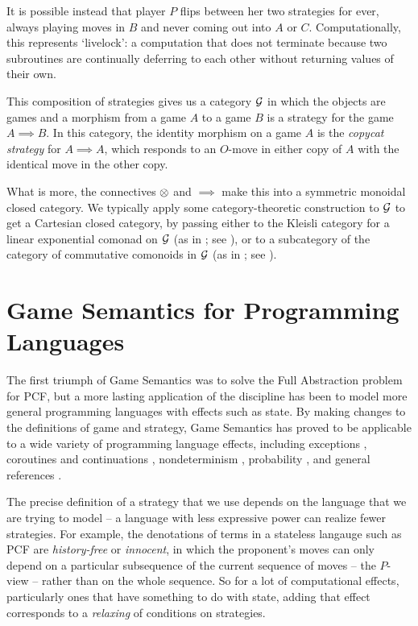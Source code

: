 \documentclass[11pt]{report}
\begin{document}
It is possible instead that player $P$ flips between her two strategies for ever, always playing moves in $B$ and never coming out into $A$ or $C$.  
Computationally, this represents `livelock': a computation that does not terminate because two subroutines are continually deferring to each other without returning values of their own.

This composition of strategies gives us a category $\mathcal G$ in which the objects are games and a morphism from a game $A$ to a game $B$ is a strategy for the game $A\implies B$.  
In this category, the identity morphism on a game $A$ is the \emph{copycat strategy} for $A\implies A$, which responds to an $O$-move in either copy of $A$ with the identical move in the other copy.

What is more, the connectives $\otimes$ and $\implies$ make this into a symmetric monoidal closed category.  
We typically apply some category-theoretic construction to $\mathcal G$ to get a Cartesian closed category, by passing either to the Kleisli category for a linear exponential comonad on $\mathcal G$ (as in \cite{ajmPcf}; see \cite{SchalkWhatIs}), or to a subcategory of the category of commutative comonoids in $\mathcal G$ (as in \cite{hoPcf,SamsonGuyIAActive}; see \cite[.2]{RusssThesis}).

\section{Game Semantics for Programming Languages}

The first triumph of Game Semantics was to solve the Full Abstraction problem for PCF, but a more lasting application of the discipline has been to model more general programming languages with effects such as state.
By making changes to the definitions of game and strategy, Game Semantics has proved to be applicable to a wide variety of programming language effects, including exceptions \cite{Lli}, coroutines and continuations \cite{FunctionalProgramsAsCoroutines}, nondeterminism \cite{mcCHFiniteND}, probability \cite{DanosHarmer}, and general references \cite{HondaMcCusker}.

The precise definition of a strategy that we use depends on the language that we are trying to model -- a language with less expressive power can realize fewer strategies.  
For example, the denotations of terms in a stateless langauge such as PCF are \emph{history-free} or \emph{innocent}, in which the proponent's moves can only depend on a particular subsequence of the current sequence of moves -- the $P$-view -- rather than on the whole sequence.
So for a lot of computational effects, particularly ones that have something to do with state, adding that effect corresponds to a \emph{relaxing} of conditions on strategies.
\end{document}
